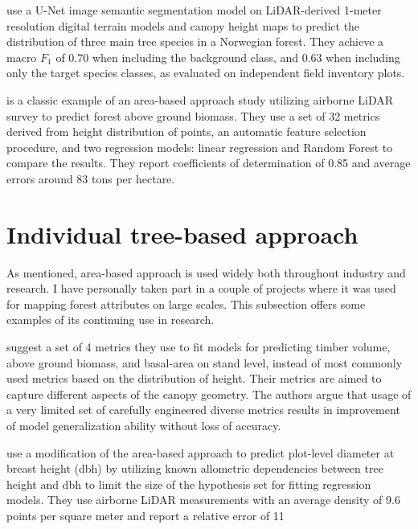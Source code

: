 \citet{vermeerLidarbasedNorwegianTree2023} use a U-Net \citep{ronnebergerUNetConvolutionalNetworks2015} image semantic segmentation model on LiDAR-derived 1-meter resolution digital terrain models and canopy height maps to predict the distribution of three main tree species in a Norwegian forest.
They achieve a macro $F_1$ of 0.70 when including the background class, and 0.63 when including only the target species classes, as evaluated on independent field inventory plots.

\citet{kcEstimationAboveGroundForest2024} is a classic example of an area-based approach study utilizing airborne LiDAR survey to predict forest above ground biomass.
They use a set of 32 metrics derived from height distribution of points, an automatic feature selection procedure, and two regression models: linear regression and Random Forest to compare the results.
They report coefficients of determination of 0.85 and average errors around 83 tons per hectare.

\section{Individual tree-based approach}\label{sec-individual-tree-approach}

As mentioned, area-based approach is used widely both throughout industry and research.
I have personally taken part in a couple of projects where it was used for mapping forest attributes on large scales.
This subsection offers some examples of its continuing use in research.

\citet{bouvierGeneralizingPredictiveModels2015} suggest a set of 4 metrics they use to fit models for predicting timber volume, above ground biomass, and basal-area on stand level, instead of most commonly used metrics based on the distribution of height.
Their metrics are aimed to capture different aspects of the canopy geometry.
The authors argue that usage of a very limited set of carefully engineered diverse metrics results in improvement of model generalization ability without loss of accuracy.

\citet{zhangImprovedAreabasedApproach2023} use a modification of the area-based approach to predict plot-level diameter at breast height (dbh) by utilizing known allometric dependencies between tree height and dbh to limit the size of the hypothesis set for fitting regression models.
They use airborne LiDAR measurements with an average density of 9.6 points per square meter and report a relative error of 11%


